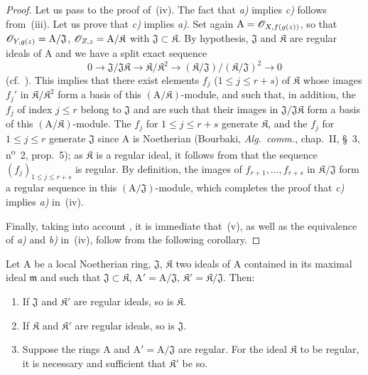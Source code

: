 \begin{proof}
Let us pass to the proof of~(iv).
The fact that \emph{a)} implies \emph{c)} follows from~(iii).
Let us prove that \emph{c)} implies \emph{a)}.
Set again $\mathrm{A}=\mathscr{O}_{X,f(g(z))}$, so that $\mathscr{O}_{Y,g(z)}=\mathrm{A}/\mathfrak{J}$,
$\mathscr{O}_{Z,z}=\mathrm{A}/\mathfrak K$ with $\mathfrak{J}\subset\mathfrak K$.
By hypothesis, $\mathfrak{J}$ and $\mathfrak K$ are regular ideals of $\mathrm{A}$ and we have a split exact sequence
\[
  0\to\mathfrak{J}/\mathfrak{J}\mathfrak K\to\mathfrak K/\mathfrak K^2\to(\mathfrak K/\mathfrak{J})/(\mathfrak K/\mathfrak{J})^2\to 0
\]
(cf.\ ).
This implies that there exist elements $f_j$ ($1\leq j\leq r+s$) of $\mathfrak K$ whose images $f_j'$ in $\mathfrak K/\mathfrak K^2$ form a basis of this $(\mathrm{A}/\mathfrak K)$-module, and such that, in addition, the $f_j$ of index $j\leq r$ belong to $\mathfrak{J}$ and are such that their images in $\mathfrak{J}/\mathfrak{J}\mathfrak K$ form a basis of this $(\mathrm{A}/\mathfrak K)$-module.
The $f_j$ for $1\leq j\leq r+s$ generate $\mathfrak K$, and the $f_j$ for $1\leq j\leq r$ generate $\mathfrak{J}$ since $\mathrm{A}$ is Noetherian (Bourbaki, \emph{Alg.\ comm.}, chap.~II, \S~3, n\textsuperscript{o}~2, prop.~5); as $\mathfrak K$ is a regular ideal, it follows from  that the sequence $(f_j)_{1\leq j\leq r+s}$ is regular.
By definition, the images of $f_{r+1},\ldots,f_{r+s}$ in $\mathfrak K/\mathfrak{J}$ form a regular sequence in this $(\mathrm{A}/\mathfrak{J})$-module, which completes the proof that \emph{c)} implies \emph{a)} in~(iv).

Finally, taking into account , it is immediate that~(v), as well as the equivalence of \emph{a)} and \emph{b)} in~(iv), follow from the following corollary.
\end{proof}

\begin{corollary}[19.1.6]
\label{IV.19.1.6}
Let $\mathrm{A}$ be a local Noetherian ring, $\mathfrak{J}$, $\mathfrak K$ two ideals of $\mathrm{A}$ contained in its maximal ideal $\mathfrak{m}$ and such that $\mathfrak{J}\subset\mathfrak K$, $\mathrm{A}'=\mathrm{A}/\mathfrak{J}$, $\mathfrak K'=\mathfrak K/\mathfrak{J}$.
Then:
\begin{enumerate}[label=\textup{(\roman*)}]
  \item If $\mathfrak{J}$ and $\mathfrak K'$ are regular ideals, so is $\mathfrak K$.
  \item If $\mathfrak K$ and $\mathfrak K'$ are regular ideals, so is $\mathfrak{J}$.
  \item Suppose the rings $\mathrm{A}$ and $\mathrm{A}'=\mathrm{A}/\mathfrak{J}$ are regular.
For the ideal $\mathfrak K$ to be regular, it is necessary and sufficient that $\mathfrak K'$ be so.
\end{enumerate}
\end{corollary}

